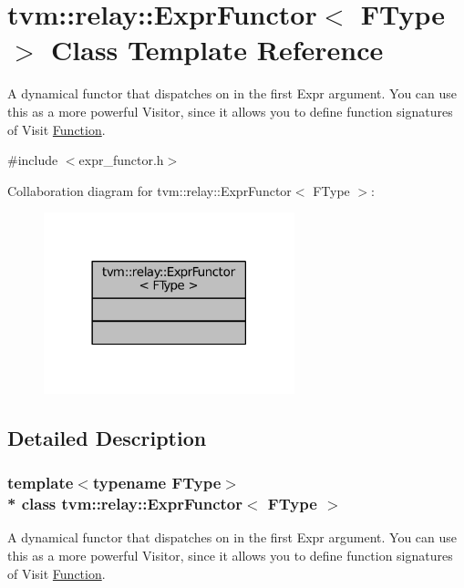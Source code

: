 \hypertarget{classtvm_1_1relay_1_1ExprFunctor}{}\section{tvm\+:\+:relay\+:\+:Expr\+Functor$<$ F\+Type $>$ Class Template Reference}
\label{classtvm_1_1relay_1_1ExprFunctor}


A dynamical functor that dispatches on in the first Expr argument. You can use this as a more powerful Visitor, since it allows you to define function signatures of Visit \hyperlink{classtvm_1_1relay_1_1Function}{Function}.  




{\ttfamily \#include $<$expr\+\_\+functor.\+h$>$}



Collaboration diagram for tvm\+:\+:relay\+:\+:Expr\+Functor$<$ F\+Type $>$\+:
\nopagebreak
\begin{figure}[H]
\begin{center}
\leavevmode
\includegraphics[width=206pt]{classtvm_1_1relay_1_1ExprFunctor__coll__graph}
\end{center}
\end{figure}


\subsection{Detailed Description}
\subsubsection*{template$<$typename F\+Type$>$\\*
class tvm\+::relay\+::\+Expr\+Functor$<$ F\+Type $>$}

A dynamical functor that dispatches on in the first Expr argument. You can use this as a more powerful Visitor, since it allows you to define function signatures of Visit \hyperlink{classtvm_1_1relay_1_1Function}{Function}. 

